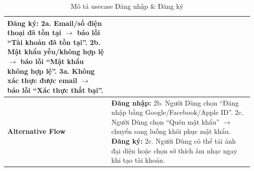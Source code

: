 \documentclass[a4paper]{article}
\begin{document}
\begin{table}[h!]
\begin{tabularx}{\textwidth}{|l|X|}
  \textbf{Đăng ký:} \newline
  2a. Email/số điện thoại đã tồn tại $\rightarrow$ báo lỗi “Tài khoản đã tồn tại”. \newline
  2b. Mật khẩu yếu/không hợp lệ $\rightarrow$ báo lỗi “Mật khẩu không hợp lệ”. \newline
  3a. Không xác thực được email $\rightarrow$ báo lỗi “Xác thực thất bại”. \\ \hline
\textbf{Alternative Flow} 
& \textbf{Đăng nhập:} \newline
  2b. Người Dùng chọn “Đăng nhập bằng Google/Facebook/Apple ID”. \newline
  2c. Người Dùng chọn “Quên mật khẩu” $\rightarrow$ chuyển sang luồng khôi phục mật khẩu. \newline
  \textbf{Đăng ký:} \newline
  2c. Người Dùng có thể tải ảnh đại diện hoặc chọn sở thích âm nhạc ngay khi tạo tài khoản. \\ \hline
\end{tabularx}
\caption{Mô tả usecase Đăng nhập \& Đăng ký}
\end{table}
\end{document}
